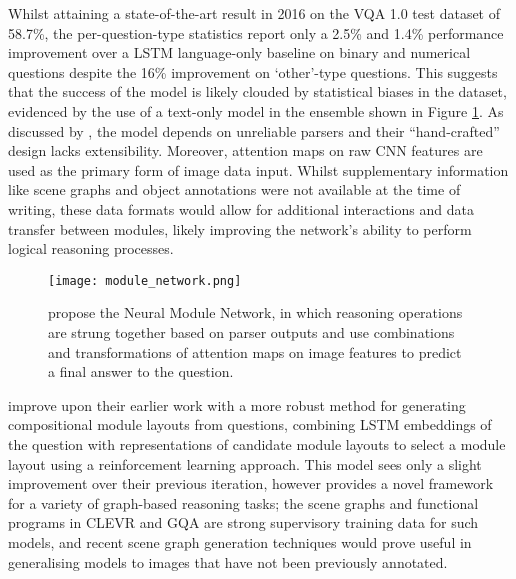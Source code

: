 Whilst attaining a state-of-the-art result in 2016 on the VQA 1.0 test dataset \cite{antol2015vqa} of 58.7\%, the per-question-type statistics report only a 2.5\% and 1.4\% performance improvement over a LSTM language-only baseline on binary and numerical questions despite the 16\% improvement on `other'-type questions. This suggests that the success of the model is likely clouded by statistical biases in the dataset, evidenced by the use of a text-only model in the ensemble shown in Figure \ref{fig:andreas2016neural_neural_module_network}. As discussed by \citeauthor{hudson2018compositional}, the model depends on unreliable parsers and their ``hand-crafted'' design lacks extensibility. Moreover, attention maps on raw CNN features are used as the primary form of image data input. Whilst supplementary information like scene graphs and object annotations were not available at the time of writing, these data formats would allow for additional interactions and data transfer between modules, likely improving the network's ability to perform logical reasoning processes.

\begin{figure}[H]
    \centering
    \texttt{[image: module\_network.png]}
    \caption{\citeauthor{andreas2016neural} propose the Neural Module Network, in which reasoning operations are strung together based on parser outputs and use combinations and transformations of attention maps on image features to predict a final answer to the question.}
    \label{fig:andreas2016neural_neural_module_network}
\end{figure}

\citeauthor{andreas2016learning} improve upon their earlier work with a more robust method for generating compositional module layouts from questions, combining LSTM embeddings of the question with representations of candidate module layouts to select a module layout using a reinforcement learning approach. This model sees only a slight improvement over their previous iteration, however provides a novel framework for a variety of graph-based reasoning tasks; the scene graphs and functional programs in CLEVR and GQA are strong supervisory training data for such models, and recent scene graph generation techniques \cite{yang2018graph} would prove useful in generalising models to images that have not been previously annotated.


